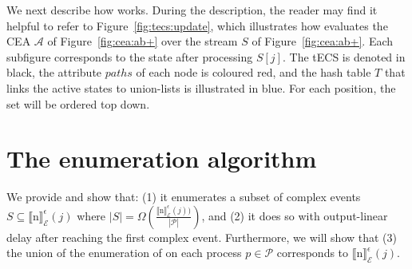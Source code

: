 We next describe how  works. During the description, the reader may find it helpful to refer to Figure~\ref{fig:tecs:update}, which illustrates how  evaluates the CEA $\mathcal{A}$ of Figure~\ref{fig:cea:ab+} over the stream $S$ of Figure~\ref{fig:cea:ab+}. Each subfigure corresponds to the state after processing $S[j]$. The tECS is denoted in black, the attribute $paths$ of each node is coloured red, and the hash table $T$ that links the active states to union-lists is illustrated in blue. For each position, the set  will be ordered top down.

\newpage
\section{The enumeration algorithm}\label{sec:enumeration}

%

We provide  and show that: (1) it enumerates a subset of complex events $S \subseteq {\llbracket \text{n} \rrbracket}^{\epsilon}_{\mathcal{E}}(j)$ where $|S| = \Omega(\frac{{\llbracket \text{n} \rrbracket}^{\epsilon}_{\mathcal{E}}(j))}{|\mathcal{P}|})$, and (2) it does so with output-linear delay after reaching the first complex event. Furthermore, we will show that (3) the union of the enumeration of  on each process $p \in \mathcal{P}$ corresponds to ${\llbracket \text{n} \rrbracket}^{\epsilon}_{\mathcal{E}}(j)$.

